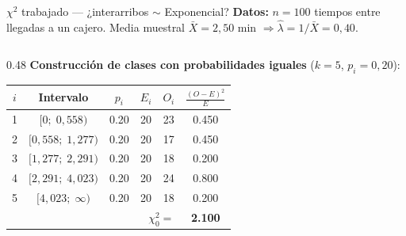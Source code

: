 \documentclass[aspectratio=1610, 10pt]{beamer}
\begin{document}
\begin{frame}{$\chi^2$ trabajado — ¿interarribos $\sim$ Exponencial?}
  \footnotesize
  \textbf{Datos:} $n=100$ tiempos entre llegadas a un cajero. Media muestral
  $\bar X=2{,}50$ min $\Rightarrow \hat\lambda=1/\bar X=0{,}40$.

  \vspace{2pt}
  \begin{columns}[T]
    \begin{column}{0.48\textwidth}
      \textbf{Construcción de clases con probabilidades iguales}
      ($k=5$, $p_i=0{,}20$):
      \begin{center}\scriptsize
        \renewcommand{\arraystretch}{1.15}
        \begin{tabular}{cccccc}
          \toprule
          $i$ & Intervalo & $p_i$ & $E_i$ & $O_i$ & $\frac{(O-E)^2}{E}$ \\
          \midrule
          1 & $[0;\;0{,}558)$        & 0.20 & 20 & 23 & 0.450 \\
          2 & $[0{,}558;\;1{,}277)$  & 0.20 & 20 & 17 & 0.450 \\
          3 & $[1{,}277;\;2{,}291)$  & 0.20 & 20 & 18 & 0.200 \\
          4 & $[2{,}291;\;4{,}023)$  & 0.20 & 20 & 24 & 0.800 \\
          5 & $[4{,}023;\;\infty)$   & 0.20 & 20 & 18 & 0.200 \\
          \midrule
          \multicolumn{5}{r}{$\chi^2_0=$} & \textbf{2.100} \\
          \bottomrule
        \end{tabular}
      \end{center}


\end{column}
\end{columns}
\end{frame}
\end{document}
